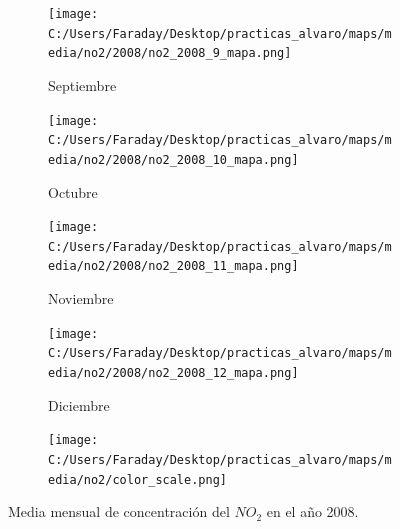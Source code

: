 \documentclass[12pt]{beamer}
\begin{document}
\begin{frame}[squeeze]
\begin{figure}[H]
\begin{subfigure}[H]{0.20\textwidth}
\texttt{[image: C:/Users/Faraday/Desktop/practicas\_alvaro/maps/media/no2/2008/no2\_2008\_9\_mapa.png]}
\captionsetup{labelformat=empty}
\caption{\scriptsize Septiembre}
\label{fig:map-no2-2008-9}
\end{subfigure}
%
\begin{subfigure}[H]{0.20\textwidth}
\texttt{[image: C:/Users/Faraday/Desktop/practicas\_alvaro/maps/media/no2/2008/no2\_2008\_10\_mapa.png]}
\captionsetup{labelformat=empty}
\caption{\scriptsize Octubre}
\label{fig:map-no2-2008-10}
\end{subfigure}
%
\begin{subfigure}[H]{0.20\textwidth}
\texttt{[image: C:/Users/Faraday/Desktop/practicas\_alvaro/maps/media/no2/2008/no2\_2008\_11\_mapa.png]}
\captionsetup{labelformat=empty}
\caption{\scriptsize Noviembre}
\label{fig:map-no2-2008-11}
\end{subfigure}
%
\begin{subfigure}[H]{0.20\textwidth}
\texttt{[image: C:/Users/Faraday/Desktop/practicas\_alvaro/maps/media/no2/2008/no2\_2008\_12\_mapa.png]}
\captionsetup{labelformat=empty}
\caption{\scriptsize Diciembre}
\label{fig:map-no2-2008-12}
\end{subfigure}

\begin{subfigure}[H]{0.45\textwidth}
\texttt{[image: C:/Users/Faraday/Desktop/practicas\_alvaro/maps/media/no2/color\_scale.png]}
\captionsetup{labelformat=empty}
\caption{}
\end{subfigure}

\vspace*{-7mm}
\caption{\scriptsize Media mensual de concentración del $NO_{2}$ en el año 2008.}
\label{fig:map-no2-2008}
\end{figure}
\end{frame}
\end{document}
